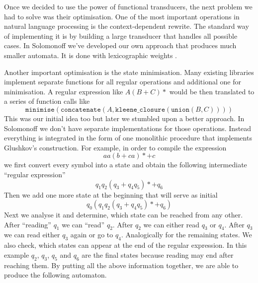 Once we decided to use the power of functional transducers, the next problem we had to solve was their optimisation. One of the most important operations in natural language processing is the context-dependent rewrite. The standard way of implementing it is by building a large transducer that handles all possible cases.
In Solomonoff we've developed our own approach that produces much smaller automata. It is done with lexicographic weights \cite{MendozaDrosik2020MultitapeAA}.

Another important optimisation is the state minimisation. Many existing libraries implement separate functions for all regular operations and additional one for minimisation. A regular expression like $A(B+C)*$ would be then translated to a series of function calls like 
\[
\texttt{minimise}(\texttt{concatenate}(A,\texttt{kleene\_closure}(\texttt{union}(B,C)))) 
\]
This was our initial idea too but later we stumbled upon a better approach. In Solomonoff we don't have separate implementations for those operations. Instead everything is integrated in the form of one monolithic procedure that implements Glushkov's construction. For example, in order to compile the expression
\[
aa(b+ca)*+c
\] we first convert every symbol into a state and obtain the following intermediate ``regular expression'' 
\[
q_1q_2(q_3+q_4 q_5)*+q_6
\]
Then we add one more state at the beginning that will serve as initial
\[
q_0(q_1q_2(q_3+q_4 q_5)*+q_6)
\]
Next we analyse it and determine, which state can be reached from any other. After ``reading'' $q_1$ we can ``read'' $q_2$. After $q_2$ we can either read $q_3$ or $q_4$. After $q_3$ we can read either $q_3$ again or go to $q_4$. Analogically for the remaining states. We also check, which states can appear at the end of the regular expression. In this example $q_2$, $q_3$, $q_5$ and $q_6$ are the final states because reading may end after reaching them. By putting all the above information together, we are able to produce the following automaton.

